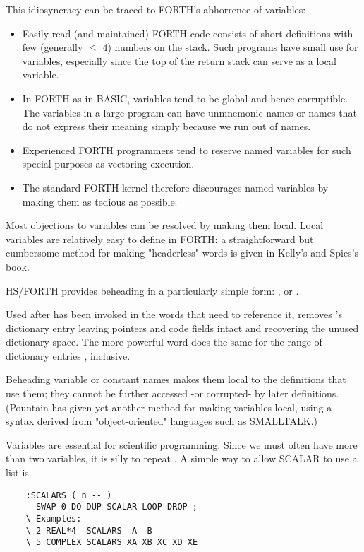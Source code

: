 This idiosyncracy can be traced to FORTH's abhorrence of variables:
\begin{itemize}
    \item Easily read (and maintained) FORTH code consists of short definitions with few (generally $\leq$ 4) numbers on the stack. Such programs have small use for variables, especially since the top of the return stack can serve as a local variable.
    \item In FORTH as in BASIC, variables tend to be global and hence corruptible. The variables in a large program can have unmnemonic names or names that do not express their meaning simply because we run out of names.
    \item Experienced FORTH programmers tend to reserve named variables for such special purposes as vectoring execution.
    \item The standard FORTH kernel therefore discourages named variables by making them as tedious as possible.
\end{itemize}

Most objections to variables can be resolved by making them local. Local variables are relatively easy to define in FORTH: a straightforward but cumbersome method for making "headerless" words is given in Kelly's and Spies's book.

HS/FORTH provides beheading in a particularly simple form: , or .

Used after  has been invoked in the words that need to reference it,  removes 's dictionary entry leaving pointers and code fields intact and recovering the unused dictionary space. The more powerful word  does the same for the range of dictionary entries , inclusive.

Beheading variable or constant names makes them local to the definitions that use them; they cannot be further accessed -or corrupted- by later definitions. (Pountain has given yet another method for making variables local, using a syntax derived from "object-oriented" languages such as SMALLTALK.)

Variables are essential for scientific programming. Since we must often have more than two variables, it is silly to repeat . A simple way to allow SCALAR to use a list is

\begin{lstlisting}
    :SCALARS ( n -- )
      SWAP 0 DO DUP SCALAR LOOP DROP ;
    \ Examples:
    \ 2 REAL*4  SCALARS  A  B
    \ 5 COMPLEX SCALARS XA XB XC XD XE
\end{lstlisting}

